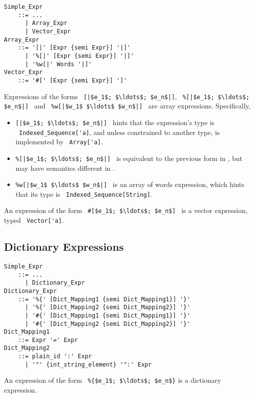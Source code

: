 \grammar\begin{lstlisting}
Simple_Expr
    ::= ...
      | Array_Expr
      | Vector_Expr
Array_Expr
    ::= '[|' [Expr {semi Expr}] '|]'
      | '%[|' [Expr {semi Expr}] '|]'
      | '%w[|' Words '|]'
Vector_Expr
    ::= '#[' [Expr {semi Expr}] ']'
\end{lstlisting}

Expressions of the forms ~\lstinline![|$e_1$; $\ldots$; $e_n$|]!, ~\lstinline!%[|$e_1$; $\ldots$; $e_n$|]!~ and ~\lstinline!%w[|$w_1$ $\ldots$ $w_n$|]!~ are array expressions. Specifically,
\begin{itemize}
  \item \lstinline![|$e_1$; $\ldots$; $e_n$|]!~ hints that the expression's type is ~\lstinline!Indexed_Sequence['a]!, and unless constrained to another type, is implemented by ~\lstinline!Array['a]!.
  \item \lstinline!%[|$e_1$; $\ldots$; $e_n$|]!~ is equivalent to the previous form in \AmlCore, but may have semantics different in \AmlSystem. %
  \item \lstinline!%w[|$w_1$ $\ldots$ $w_n$|]!~ is an array of words expression, which hints that its type is ~\lstinline!Indexed_Sequence[String]!. 
\end{itemize}

An expression of the form ~\lstinline!#[$e_1$; $\ldots$; $e_n$]!~ is a vector expression, typed ~\lstinline!Vector['a]!.





\subsection{Dictionary Expressions}
\label{sec:dict-expressions}

\grammar\begin{lstlisting}
Simple_Expr 
    ::= ...
      | Dictionary_Expr
Dictionary_Expr 
    ::= '%{' [Dict_Mapping1 {semi Dict_Mapping1}] '}'
      | '%{' [Dict_Mapping2 {semi Dict_Mapping2}] '}'
      | '#{' [Dict_Mapping1 {semi Dict_Mapping1}] '}'
      | '#{' [Dict_Mapping2 {semi Dict_Mapping2}] '}'
Dict_Mapping1
    ::= Expr '=' Expr
Dict_Mapping2 
    ::= plain_id ':' Expr
      | '"' {int_string_element} '":' Expr
\end{lstlisting}

An expression of the form ~\lstinline!%{$e_1$; $\ldots$; $e_n$}! is a dictionary expression. 





